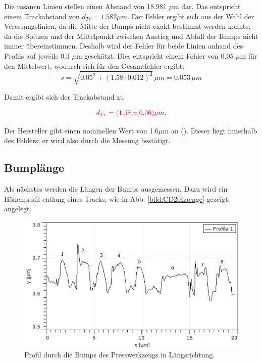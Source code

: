 Die rosanen Linien stellen einen Abstand von 18.981 $\mu$m dar. Das entspricht einem Trackabstand von $d_{Tr} = 1.582 \mu m$.
Der Fehler ergibt sich aus der Wahl der Veressungslinien, da die Mitte der Bumps nicht exakt bestimmt werden konnte, da die Spitzen und 
der Mittelpunkt zwischen Anstieg und Abfall der Bumps nicht immer übereinstimmen. Deshalb wird der Fehler für beide Linien anhand des 
Profils auf jeweils 0.3 $\mu$m geschätzt. Dies entspricht einem Fehler von 0.05 $\mu$m für den Mittelwert, wodurch sich für den Gesamtfehler ergibt: 
\begin{equation*}
    s = \sqrt{0.05^2 + (1.58 \cdot 0.012)^2}\, \mu m = 0.053\, \mu m
\end{equation*}

Damit ergibt sich der Trackabstand zu

\begin{equation*}
    \textcolor{red}{d_{Tr} = (1.58 \pm 0.06) \mu m}.
\end{equation*}

Der Hersteller gibt einen nominellen Wert von 1.6$\mu$m an (\cite{SampleKit2007}). 
Dieser liegt innerhalb des Fehlers; er wird also durch die Messung bestätigt.

\subsection{Bumplänge}

Als nächstes werden die Längen der Bumps ausgemessen. Dazu wird ein Höhenprofil entlang eines Tracks, wie in Abb. \ref{bild:CD20Laenge} 
gezeigt, angelegt.  

\begin{figure}[h]
    \centering
    \includegraphics[scale = 0.8]{Bilder/CD20LaengeProfil.png}
    \caption{Profil durch die Bumps des Presswerkzeugs in Längsrichtung.}
    \label{bild:CD20LaengeProfil}
\end{figure}


